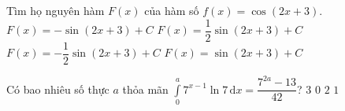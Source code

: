 \begin{ex}%
	Tìm họ nguyên hàm $F(x)$ của hàm số $f(x)=\cos (2x+3)$.
	\choice
	{$F(x)=-\sin (2x+3)+C$}
	{\True $F(x)=\dfrac{1}{2}\sin (2x+3)+C$}
	{$F(x)=-\dfrac{1}{2}\sin (2x+3)+C$}
	{$F(x)=\sin (2x+3)+C$}
\end{ex}
\begin{ex}%
	Có bao nhiêu số thực $a$ thỏa mãn $\displaystyle\int\limits_0^a 7^{x-1}\ln 7\mathrm{\,d}x=\dfrac{7^{2a}-13}{42}$?
	\choice
	{$3$}
	{$0$}
	{$2$}
	{\True$1$}
\end{ex}

